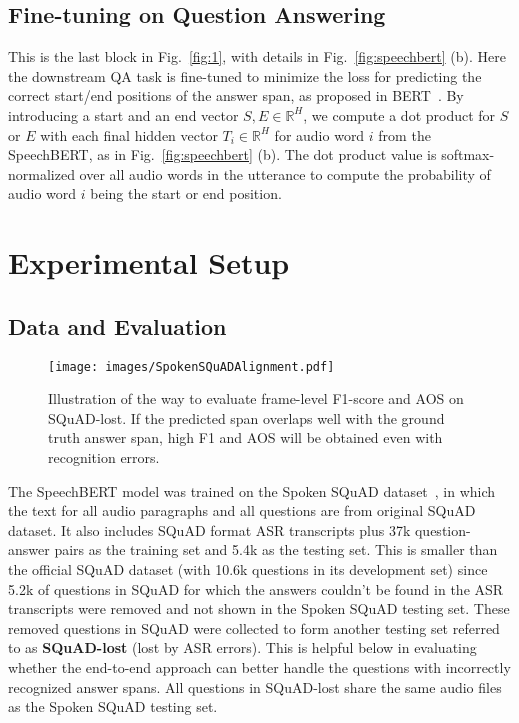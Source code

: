 \documentclass[a4paper]{article}
\begin{document}
\vspace{-5pt}
\subsection{Fine-tuning on Question Answering}
\label{ssec:finetune}

\vspace{-5pt}
This is the last block in Fig.~\ref{fig:1}, with details in Fig.~\ref{fig:speechbert} (b). Here the downstream QA task is fine-tuned to minimize the loss for predicting the correct start/end positions of the answer span, as proposed in BERT~\cite{devlin2019bert}. By introducing a start and an end vector $S, E \in \mathbb{R}^{H}$, we compute a dot product for $S$ or $E$ with each final hidden vector $T_i \in \mathbb{R}^{H}$  for audio word $i$ from the SpeechBERT, as in Fig.~\ref{fig:speechbert} (b). The dot product value is softmax-normalized over all audio words in the utterance to compute the probability of audio word $i$ being the start or end position.
 
\vspace{-5pt}
\section{Experimental Setup}
\label{sec:expsetup}


\vspace{-5pt}
\subsection{Data and Evaluation}
\label{ssec:data}

\begin{figure}[t!]
    \centering
    \texttt{[image: images/SpokenSQuADAlignment.pdf]}
    \caption{Illustration of the way to evaluate frame-level F1-score and AOS on SQuAD-lost. If the predicted span overlaps well with the ground truth answer span, high F1 and AOS will be obtained even with recognition errors.}
    \label{fig:spokenalign}
\vspace{-20pt}
\end{figure}

\vspace{-5pt}
The SpeechBERT model was trained on the Spoken SQuAD dataset~\cite{Lee2018spoken}, in which the text for all audio paragraphs and all questions are from original SQuAD~\cite{squad2016} dataset. It also includes SQuAD format ASR transcripts plus 37k question-answer pairs as the training set and 5.4k as the testing set. This is smaller than the official SQuAD dataset (with 10.6k questions in its development set) since 5.2k of questions in SQuAD for which the answers couldn't be found in the ASR transcripts were removed and not shown in the Spoken SQuAD testing set. These removed questions in SQuAD were collected to form another testing set referred to as \textbf{SQuAD-lost} (lost by ASR errors). This is helpful below in evaluating whether the end-to-end approach can better handle the questions with incorrectly recognized answer spans. All questions in SQuAD-lost share the same audio files as the Spoken SQuAD testing set.
\end{document}
